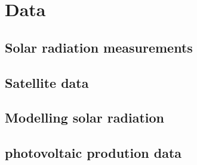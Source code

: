 \chapter{Data\label{cha:data}}
\section{Solar radiation measurements}
\section{Satellite data}
\section{Modelling solar radiation}
\section{photovoltaic prodution data}


